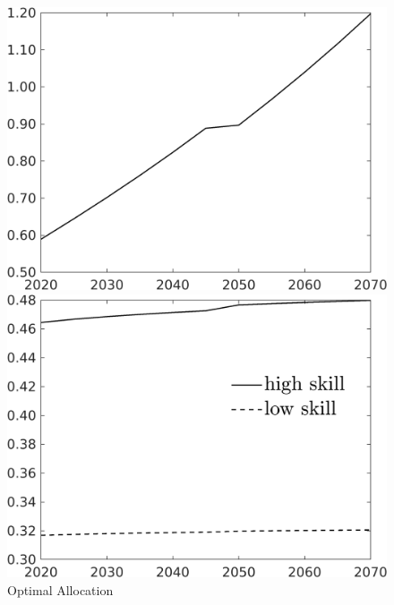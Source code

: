 \begin{figure}[h!!]
	\centering
	\caption{Optimal Allocation }\label{fig:optAll}
	
	
	\begin{minipage}[]{0.32\textwidth}
		\includegraphics[width=1\textwidth]{../../codding_model/own_basedOnFried/optimalPol_190722_tidiedUp/figures/all_10Aout22/Single_OPT_T_NoTaus_C_regime3_spillover0_noskill0_sep1_xgrowth0_extern0_etaa0.79.png}
	\end{minipage}
	\begin{minipage}[]{0.32\textwidth}
		\includegraphics[width=1\textwidth]{../../codding_model/own_basedOnFried/optimalPol_190722_tidiedUp/figures/all_10Aout22/SingleJointTOT_regime3_OPT_T_NoTaus_Labour_spillover0_noskill0_sep1_xgrowth0_extern0_PV1_etaa0.79_lgd1.png}

\end{minipage}
\end{figure}

